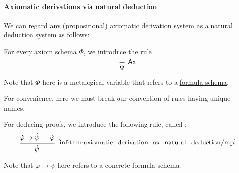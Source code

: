 \paragraph{Axiomatic derivations via natural deduction}

\begin{remark}\label{rem:axiomatic_derivation_system_as_natural_deduction_system}
  We can regard any (propositional) \hyperref[def:axiomatic_derivation_system]{axiomatic derivation system} as a \hyperref[def:propositional_natural_deduction_system]{natural deduction system} as follows:
  \begin{thmenum}
     For every axiom schema \( \Phi \), we introduce the rule
    \begin{equation*}
      \begin{prooftree}
        \infer0[\logic{Ax}]{ \Phi }
      \end{prooftree}
    \end{equation*}

    Note that \( \Phi \) here is a metalogical variable that refers to a \hyperref[def:propositional_formula_schema]{formula schema}.

    For convenience, here we must break our convention of rules having unique names.

     For deducing proofs, we introduce the following rule, called :
    \begin{equation*}\taglabel[\ensuremath{ \logic{MP} }]{inf:thm:axiomatic_derivation_as_natural_deduction/mp}
      \begin{prooftree}
        \hypo{ \syn\varphi \rightarrow \syn\psi }
        \hypo{ \syn\varphi }
        \infer2[\ref{inf:thm:axiomatic_derivation_as_natural_deduction/mp}]{ \syn\psi }
      \end{prooftree}
    \end{equation*}

    Note that \( \varphi \rightarrow \psi \) here refers to a concrete formula schema.
  \end{thmenum}
\end{remark}

